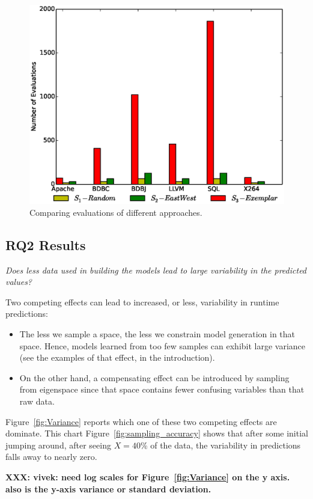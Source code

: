 \documentclass{sig-alternative}
\newcommand{\bi}{\begin{itemize}}%
\newcommand{\ei}{\end{itemize}}
\newcommand{\fig}[1]{Figure~\ref{fig:#1}}
\begin{document}
\begin{figure}[!t]
\includegraphics[width=0.9\linewidth]{Figures/evaluation_graph.eps}
\caption{ Comparing evaluations of different approaches. }\label{fig:Evaluations}
\end{figure}


\subsection{RQ2 Results}

{\em
Does less data used in building the models lead to large variability in the predicted values?}

Two competing effects can lead to increased, or less,  variability  in 
runtime predictions:
\bi
\item
The less we sample a space,
the less we constrain model generation in that space. Hence, models learned
from too few samples can exhibit large variance (see the examples of that effect,
in the introduction). 
\item
On the other hand, a compensating effect can be introduced by sampling from eigenspace
since that space contains fewer confusing variables than that raw data.
\ei
\fig{Variance} reports which one of these two competing effects are dominate. 
This chart \fig{sampling_accuracy} shows that after some initial jumping around,
after seeing $X=40$\% of the data, the variability in predictions falls away to nearly zero.

{\bf XXX: vivek: need log scales for \fig{Variance} on the y axis. also is the y-axis variance or standard deviation.}
\end{document}
